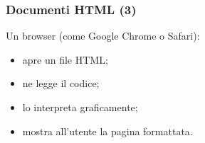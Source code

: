 \documentclass[]{beamer}
\begin{document}
\begin{frame}
\frametitle{Documenti HTML (3)}
Un browser (come Google Chrome o Safari):\pause
\begin{itemize}
  \item apre un file HTML;\pause
  \item ne legge il codice;\pause
  \item lo interpreta graficamente;\pause
  \item mostra all'utente la pagina formattata.\pause
\end{itemize}
\vspace*{-.7cm}
\begin{columns}
\begin{column}{0.45\textwidth}
\begin{figure}
\end{figure}
\end{column}
\begin{column}{0.45\textwidth}
\begin{figure}
\end{figure}
\end{column}
\end{columns}
\end{frame}
\end{document}
